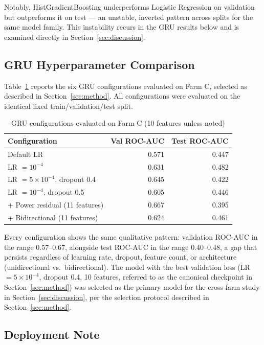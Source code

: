 \documentclass[conference]{IEEEtran}
\begin{document}
Notably, HistGradientBoosting underperforms Logistic Regression on
validation but outperforms it on test --- an unstable, inverted pattern
across splits for the same model family. This instability recurs in the
GRU results below and is examined directly in
Section~\ref{sec:discussion}.
 
\subsection{GRU Hyperparameter Comparison}
 
Table~\ref{tab:gru_configs} reports the six GRU configurations evaluated
on Farm C, selected as described in
Section~\ref{sec:method}. All configurations were evaluated on the
identical fixed train/validation/test split.
 
\begin{table}[t]
\caption{GRU configurations evaluated on Farm C (10 features unless noted)}
\label{tab:gru_configs}
\centering
\begin{tabular}{@{}lrr@{}}
\toprule
Configuration & Val ROC-AUC & Test ROC-AUC \\
\midrule
Default LR                        & 0.571 & 0.447 \\
LR $=10^{-4}$                     & 0.631 & 0.482 \\
LR $=5\times10^{-4}$, dropout 0.4 & 0.645 & 0.422 \\
LR $=10^{-4}$, dropout 0.5        & 0.605 & 0.446 \\
+ Power residual (11 features)    & 0.667 & 0.395 \\
+ Bidirectional (11 features)     & 0.624 & 0.461 \\
\bottomrule
\end{tabular}
\end{table}
 
Every configuration shows the same qualitative pattern: validation
ROC-AUC in the range 0.57--0.67, alongside test ROC-AUC in the range
0.40--0.48, a gap that persists regardless of learning rate, dropout,
feature count, or architecture (unidirectional vs.\ bidirectional). The
model with the best validation loss (LR $=5\times10^{-4}$, dropout 0.4,
10 features, referred to as the canonical checkpoint in
Section~\ref{sec:method}) was selected as the primary model for the
cross-farm study in Section~\ref{sec:discussion}, per the selection
protocol described in Section~\ref{sec:method}.
 
\subsection{Deployment Note}
 
\end{document}
